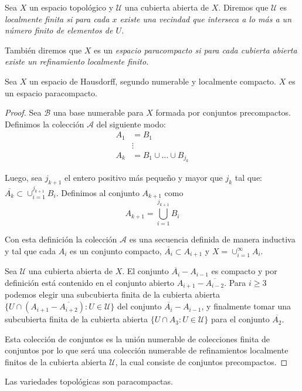 \begin{definition}
	Sea $X$ un espacio topológico y $\mathcal{U}$ una cubierta abierta de $X$. Diremos que $\mathcal{U}$  es \it{localmente finita} si para cada $x$ existe una vecindad que interseca a lo más a un número finito de elementos de $U$.

	También diremos que $X$ es un \it{espacio paracompacto} si para cada cubierta abierta existe un refinamiento localmente finito.
\end{definition}

\begin{theorem}  \label{Teorema: Espacios Precompactos}
	Sea $X$ un espacio de Hausdorff, segundo numerable y localmente compacto. $X$ es un espacio paracompacto.
\end{theorem}

\begin{proof}
	Sea $\mathcal{B}$ una base numerable para $X$ formada por conjuntos precompactos. Definimos la colección $\mathcal{A}$ del siguiente modo:
	\begin{align*}
		A_1 & = B_1                         \\
		    & \vdots                        \\
		A_k & = B_1 \cup \dots \cup B_{j_k}
	\end{align*}

	Luego, sea $j_{k+1}$ el entero positivo más pequeño y mayor que $j_k$ tal que: $\overline{A_k} \subset \cup_{i=1}^{j_{k+1}} B_i$. Definimos al conjunto $A_{k+1}$ como
	\[
		A_{k+1} = \bigcup_{i=1}^{j_{k+1}} B_i
	\]

	Con esta definición la colección $\mathcal{A}$ es una secuencia definida de manera inductiva y tal que cada $A_i$ es un conjunto compacto, $\overline{A_i} \subset A_{i+1}$ y $X = \cup_{i=1}^{\infty} A_i$.

	Sea $\mathcal{U}$ una cubierta abierta de $X$. El conjunto $\overline{A_i} - A_{i-1}$ es compacto y por definición está contenido en el conjunto abierto $A_{i+1} - \overline{A_{i-2}}$. Para $i \geq 3$ podemos elegir una subcubierta finita de la cubierta abierta $\{U \cap (A_{i+1} - \overline{A_{i+2}}) : U \in \mathcal{U} \}$ del conjunto $\overline{A_{i}} - A_{i-1}$, y finalmente tomar una subcubierta finita de la cubierta abierta $\{U \cap A_3: U \in \mathcal{U}\}$ para el conjunto $\overline{A_2}$.

	Esta colección de conjuntos es la unión numerable de colecciones finita de conjuntos por lo que será una colección numerable de refinamientos localmente finitos de la cubierta abierta $\mathcal{U}$, la cual consiste de conjuntos precompactos.
\end{proof}

\begin{corollary} \label{Corolario: Variedades Precompactas}
	Las variedades topológicas son paracompactas.
\end{corollary}
